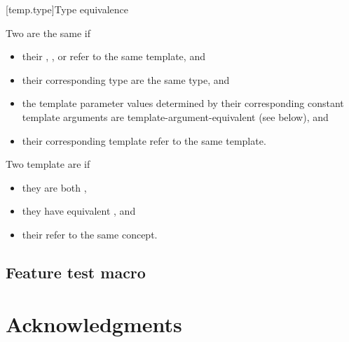 \documentclass{wg21}
\begin{document}
[temp.type]{Type equivalence}

\pnum
{}%
Two  are the same if
\begin{itemize}
\item
their ,
, or
refer to the same template, and

\item
their corresponding type 
are the same type, and

\item
the template parameter values determined by
their corresponding constant template arguments 
are template-argument-equivalent (see below), and

\item
their corresponding template 
refer to the same template.
\end{itemize}


\begin{addedblock}
Two template  are  if
\begin{itemize}
\item they are both ,
\item they have equivalent , and
\item their  refer to the same concept.
\end{itemize}
\end{addedblock}



\subsection{Feature test macro}




\section{Acknowledgments}
\end{document}
